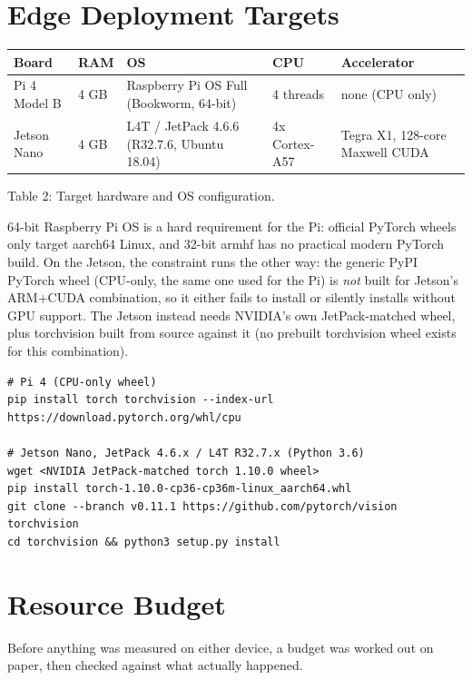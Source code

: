 \documentclass[11pt]{article}
\begin{document}
\section{Edge Deployment Targets}

\begin{center}
\small
\begin{tabular}{@{}L{2.1cm}L{1cm}L{4.7cm}L{2.3cm}L{4cm}@{}}
\toprule
Board & RAM & OS & CPU & Accelerator \\
\midrule
Pi 4 Model B & 4 GB & Raspberry Pi OS Full (Bookworm, 64-bit) & 4 threads & none (CPU only) \\
Jetson Nano & 4 GB & L4T / JetPack 4.6.6 (R32.7.6, Ubuntu 18.04) & 4x Cortex-A57 & Tegra X1, 128-core Maxwell CUDA \\
\bottomrule
\end{tabular}
\end{center}
\begin{center}\small Table 2: Target hardware and OS configuration.\end{center}

64-bit Raspberry Pi OS is a hard requirement for the Pi: official PyTorch wheels only
target aarch64 Linux, and 32-bit armhf has no practical modern PyTorch build. On the
Jetson, the constraint runs the other way: the generic PyPI PyTorch wheel (CPU-only, the
same one used for the Pi) is \emph{not} built for Jetson's ARM+CUDA combination, so it
either fails to install or silently installs without GPU support. The Jetson instead
needs NVIDIA's own JetPack-matched wheel, plus torchvision built from source against it
(no prebuilt torchvision wheel exists for this combination).

\begin{verbatim}
# Pi 4 (CPU-only wheel)
pip install torch torchvision --index-url https://download.pytorch.org/whl/cpu

# Jetson Nano, JetPack 4.6.x / L4T R32.7.x (Python 3.6)
wget <NVIDIA JetPack-matched torch 1.10.0 wheel>
pip install torch-1.10.0-cp36-cp36m-linux_aarch64.whl
git clone --branch v0.11.1 https://github.com/pytorch/vision torchvision
cd torchvision && python3 setup.py install
\end{verbatim}

\section{Resource Budget}

Before anything was measured on either device, a budget was worked out on paper, then
checked against what actually happened.
\end{document}
